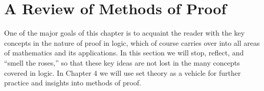 \documentclass[10pt,]{book}
\theoremstyle{plain}
\theoremstyle{definition}
\theoremstyle{definition}
\theoremstyle{definition}
\theoremstyle{definition}
\begin{document}
\par\smallskip\noindent
\typeout{************************************************}
\typeout{************************************************}
\section[A Review of Methods of Proof]{A Review of Methods of Proof}\label{c3s9}
\typeout{************************************************}
\typeout{************************************************}
One of the major goals of this chapter is to acquaint the reader with the key concepts in the nature of proof in logic, which of course carries over into all areas of mathematics and its applications. In this section we will stop, reflect, and ``smell the roses,'' so that these key ideas are not lost in the many concepts covered in logic. In Chapter 4 we will use set theory as a vehicle for further practice and insights into methods of proof.%
\typeout{************************************************}
\typeout{************************************************}
\end{document}
